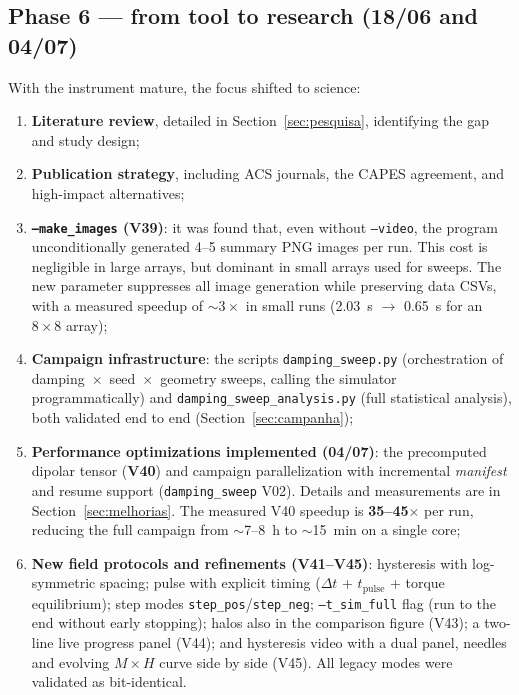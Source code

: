\documentclass[11pt,a4paper]{article}
\newcommand{\code}[1]{\texttt{#1}}
\begin{document}
\subsection{Phase 6 --- from tool to research (18/06 and 04/07)}

With the instrument mature, the focus shifted to science:

\begin{enumerate}
\item \textbf{Literature review}, detailed in Section~\ref{sec:pesquisa}, identifying the gap and study design;
\item \textbf{Publication strategy}, including ACS journals, the CAPES agreement, and high-impact alternatives;
\item \textbf{\code{--make\_images} (V39)}: it was found that, even without \code{--video}, the program unconditionally generated 4--5 summary PNG images per run. This cost is negligible in large arrays, but dominant in small arrays used for sweeps. The new parameter suppresses all image generation while preserving data CSVs, with a measured speedup of $\sim 3\times$ in small runs (2.03~s $\to$ 0.65~s for an $8\times8$ array);
\item \textbf{Campaign infrastructure}: the scripts \code{damping\_sweep.py} (orchestration of damping~$\times$~seed~$\times$~geometry sweeps, calling the simulator programmatically) and \code{damping\_sweep\_analysis.py} (full statistical analysis), both validated end to end (Section~\ref{sec:campanha});
\item \textbf{Performance optimizations implemented (04/07)}: the precomputed dipolar tensor (\textbf{V40}) and campaign parallelization with incremental \emph{manifest} and resume support (\code{damping\_sweep} V02). Details and measurements are in Section~\ref{sec:melhorias}. The measured V40 speedup is \textbf{35--45$\times$} per run, reducing the full campaign from $\sim$7--8~h to $\sim$15~min on a single core;
\item \textbf{New field protocols and refinements (V41--V45)}: hysteresis with log-symmetric spacing; pulse with explicit timing ($\Delta t$ + $t_{\mathrm{pulse}}$ + torque equilibrium); step modes \code{step\_pos}/\code{step\_neg}; \code{--t\_sim\_full} flag (run to the end without early stopping); halos also in the comparison figure (V43); a two-line live progress panel (V44); and hysteresis video with a dual panel, needles and evolving $M\times H$ curve side by side (V45). All legacy modes were validated as bit-identical.
\end{enumerate}
\end{document}
